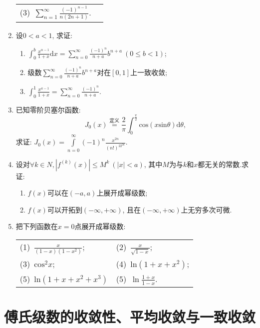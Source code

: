 \begin{enumerate}
\begin{table}[H]
\begin{tabular}{ll}
			(3)\ $\sum\limits_{n=1}^{\infty}\frac{(-1)^{n-1}}{n(2n+1)}$.
	\end{tabular}
	\end{table}
\item 设$0<a<1$, 求证:
\begin{enumerate}
\item $\displaystyle{\int_{0}^{b}\frac{x^{\alpha-1}}{1+x}\mathrm{d}x=\sum\limits_{n=0}^{\infty}\frac{(-1)^n}{n+a}b^{n+a}}\ (0\le b<1)$;
\item 级数$\sum\limits_{n=0}^{\infty}\frac{(-1)^n}{n+a}b^{n+a}$对在$[0,1]$上一致收敛;
\item $\displaystyle{\int_{0}^{1}\frac{x^{a-1}}{1+x}=\sum\limits_{n=0}^{\infty}\frac{(-1)^n}{n+a}}$.
\end{enumerate}
\item 已知零阶贝塞尔函数:
	$$ J_0(x) \overset{\text{定义}}{=}\frac{2}{\pi}\int_{0}^{\frac{\pi}{2}}\mathrm{cos}(x\mathrm{sin}\theta)\mathrm{d}\theta,$$
	求证: $J_0(x)=\int\limits_{n=0}^{\infty}(-1)^n\frac{x^{2n}}{(n!)^22^{2n}}$.
	\item 设对$\forall k \in N, |f^{(k)}(x)|\le M^k\ (|x|<a)$, 其中$M$为与$k$和$x$都无关的常数.求证:
	\begin{enumerate}
		\item $f(x)$可以在$(-a,a)$上展开成幂级数;
		\item $f(x)$可以开拓到$(-\infty,+\infty)$, 且在$(-\infty,+\infty)$上无穷多次可微.
	\end{enumerate}
\item 把下列函数在$x=0$点展开成幂级数:
\begin{table}[H]
	\begin{tabular}{ll}
		(1)\ $\frac{x}{(1-x)(1-x^2)}$;\qquad \qquad \qquad \qquad \qquad &(2)\ $\frac{x}{\sqrt{1-x}}$;\\
		(3)\ $\mathrm{cos}^2x$;\qquad \qquad \qquad \qquad \qquad &(4)\ $\mathrm{ln}(1+x+x^2)$;\\
		(5)\ $\mathrm{ln}(1+x+x^2+x^3)$\qquad \qquad \qquad \qquad \qquad &(5)\ $\mathrm{\ln}\frac{1+x}{1-x}$.
	\end{tabular}
\end{table}
\end{enumerate}
\section{傅氏级数的收敛性、平均收敛与一致收敛}